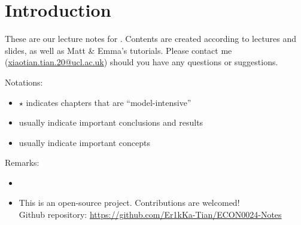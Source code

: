 \chapter*{Introduction}
These are our  lecture notes for . Contents are created according to lectures and slides, as well as Matt \& Emma's tutorials. Please contact me (\url{xiaotian.tian.20@ucl.ac.uk}) should you have any questions or suggestions.

Notations:
\begin{itemize}
    \item $\star$ indicates chapters that are ``model-intensive''
    \item {} usually indicate important conclusions and results
    \item {} usually indicate important concepts
\end{itemize}

Remarks:
\begin{itemize}
    \item {}
    \item This is an open-source project. Contributions are welcomed!\\Github repository: \url{https://github.com/Er1kKa-Tian/ECON0024-Notes}
\end{itemize}



\iffalse
    \begin{figure}[H]
        \centering
        \texttt{[image: images/102115356\_p0.jpg]}
        \caption{Enjoy this lovely picture before we start!}
        \label{fig:Introduction}
    \end{figure}
\fi